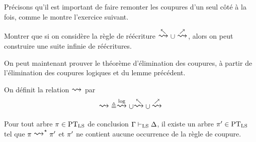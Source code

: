 Précisons qu'il est important de faire remonter les coupures d'un seul côté à la
fois, comme le montre l'exercice suivant.

\begin{exercise}
  Montrer que si on considère la règle de réécriture
  $\reecr{\nwarrow}\cup\reecr{\nearrow}$, alors on peut construire une
  suite infinie de réécritures.
\end{exercise}

On peut maintenant prouver le théorème d'élimination des coupures, à partir de
l'élimination des coupures logiques et du lemme précédent.

\begin{definition}
  On définit la relation $\reecr{}$ par
  \[\mathord{\reecr{}}\defeq \reecr{\logR}\cup
  \mathord{\reecr{\nwarrow}}\cup\mathord{\reecr{\nearrow}}\]
\end{definition}

\begin{theorem}
  \label{thm.cut.elim}
  Pour tout arbre $\pi \in \operatorname{PT}_{\operatorname{LS}}$ de conclusion $\Gamma\vdash_{\operatorname{LS}}\Delta$, il
  existe un arbre $\pi' \in \operatorname{PT}_{\operatorname{LS}}$ tel que
  $\varPT \rtClot{\reecr{}}\varPT'$ et $\pi'$ ne contient aucune occurrence
  de la règle de coupure.
\end{theorem}

